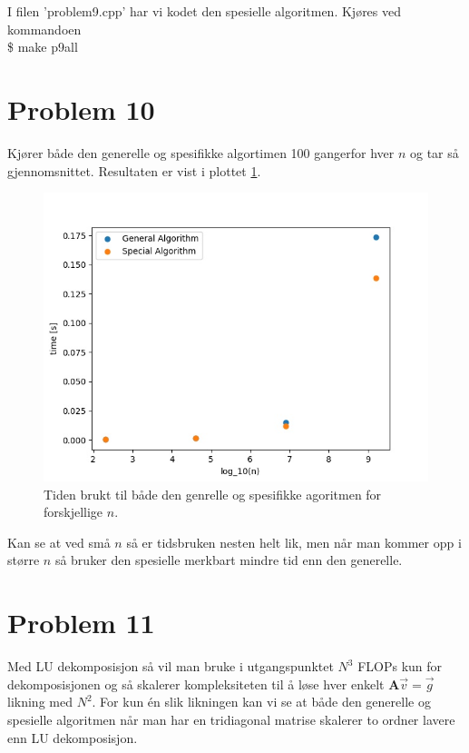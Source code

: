 \documentclass[english,notitlepage]{revtex4-1}  %
\begin{document}
I filen 'problem9.cpp' har vi kodet den spesielle algoritmen. Kjøres ved kommandoen \\

\$ make p9all



\section*{Problem 10}

Kjører både den generelle og spesifikke algortimen 100 gangerfor hver $n$ og tar så gjennomsnittet. Resultaten er vist i plottet \ref{timeplot}.

\begin{figure}[ht]
\centering
\includegraphics[scale=0.65]{Images/plottime.jpg}
\caption{Tiden brukt til både den genrelle og spesifikke agoritmen for forskjellige $n$.}
\label{timeplot}
\end{figure}

Kan se at ved små $n$ så er tidsbruken nesten helt lik, men når man kommer opp i større $n$ så bruker den spesielle merkbart mindre tid enn den generelle.

\section*{Problem 11}

Med LU dekomposisjon så vil man bruke i utgangspunktet $N^3$ FLOPs kun for dekomposisjonen og så skalerer kompleksiteten til å løse hver enkelt $\textbf{A}\vec{v}= \vec{g}$ likning med $N^2$. For kun én slik likningen kan vi se at både den generelle og spesielle algoritmen når man har en tridiagonal matrise skalerer to ordner lavere enn LU dekomposisjon.
\end{document}
